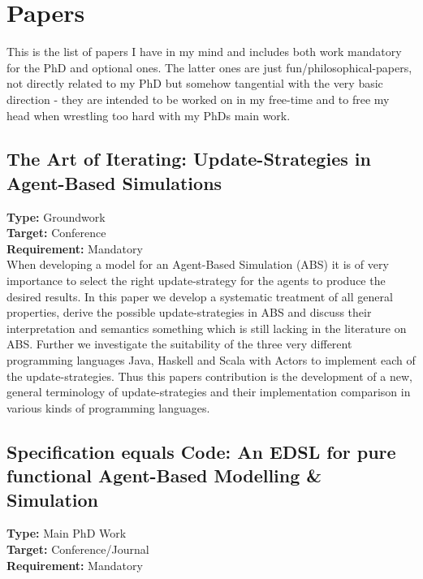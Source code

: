 \section{Papers}
This is the list of papers I have in my mind and includes both work mandatory for the PhD and optional ones. The latter ones are just fun/philosophical-papers, not directly related to my PhD but somehow tangential with the very basic direction - they are intended to be worked on in my free-time and to free my head when wrestling too hard with my PhDs main work.

\subsection{The Art of Iterating: Update-Strategies in Agent-Based Simulations}
\textbf{Type:} Groundwork \\
\textbf{Target:} Conference \\
\textbf{Requirement:} Mandatory \\

When developing a model for an Agent-Based Simulation (ABS) it is of very importance to select the right update-strategy for the agents to produce the desired results. In this paper we develop a systematic treatment of all general properties, derive the possible update-strategies in ABS and discuss their interpretation and semantics something which is still lacking in the literature on ABS. Further we investigate the suitability of the three very different programming languages Java, Haskell and  Scala with Actors to implement each of the update-strategies. Thus this papers contribution is the development of a new, general terminology of update-strategies and their implementation comparison in various kinds of programming languages.

\subsection{Specification equals Code: An EDSL for pure functional Agent-Based Modelling \& Simulation}
\textbf{Type:} Main PhD Work \\
\textbf{Target:} Conference/Journal \\
\textbf{Requirement:} Mandatory \\


